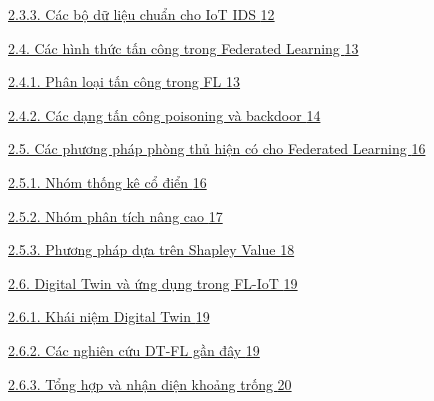 \hyperref[cuxe1c-bux1ed9-dux1eef-liux1ec7u-chuux1ea9n-cho-iot-ids]{2.3.3. Các bộ dữ liệu chuẩn cho IoT IDS \hyperref[cuxe1c-bux1ed9-dux1eef-liux1ec7u-chuux1ea9n-cho-iot-ids]{12}}

\hyperref[cuxe1c-huxecnh-thux1ee9c-tux1ea5n-cuxf4ng-trong-federated-learning]{2.4. Các hình thức tấn công trong Federated Learning \hyperref[cuxe1c-huxecnh-thux1ee9c-tux1ea5n-cuxf4ng-trong-federated-learning]{13}}

\hyperref[phuxe2n-loux1ea1i-tux1ea5n-cuxf4ng-trong-fl]{2.4.1. Phân loại tấn công trong FL \hyperref[phuxe2n-loux1ea1i-tux1ea5n-cuxf4ng-trong-fl]{13}}

\hyperref[cuxe1c-dux1ea1ng-tux1ea5n-cuxf4ng-poisoning-vuxe0-backdoor]{2.4.2. Các dạng tấn công poisoning và backdoor \hyperref[cuxe1c-dux1ea1ng-tux1ea5n-cuxf4ng-poisoning-vuxe0-backdoor]{14}}

\hyperref[cuxe1c-phux1b0ux1a1ng-phuxe1p-phuxf2ng-thux1ee7-hiux1ec7n-cuxf3-cho-federated-learning]{2.5. Các phương pháp phòng thủ hiện có cho Federated Learning \hyperref[cuxe1c-phux1b0ux1a1ng-phuxe1p-phuxf2ng-thux1ee7-hiux1ec7n-cuxf3-cho-federated-learning]{16}}

\hyperref[nhuxf3m-thux1ed1ng-kuxea-cux1ed5-ux111iux1ec3n]{2.5.1. Nhóm thống kê cổ điển \hyperref[nhuxf3m-thux1ed1ng-kuxea-cux1ed5-ux111iux1ec3n]{16}}

\hyperref[nhuxf3m-phuxe2n-tuxedch-nuxe2ng-cao]{2.5.2. Nhóm phân tích nâng cao \hyperref[nhuxf3m-phuxe2n-tuxedch-nuxe2ng-cao]{17}}

\hyperref[phux1b0ux1a1ng-phuxe1p-dux1ef1a-truxean-shapley-value]{2.5.3. Phương pháp dựa trên Shapley Value \hyperref[phux1b0ux1a1ng-phuxe1p-dux1ef1a-truxean-shapley-value]{18}}

\hyperref[digital-twin-vuxe0-ux1ee9ng-dux1ee5ng-trong-fl-iot]{2.6. Digital Twin và ứng dụng trong FL-IoT \hyperref[digital-twin-vuxe0-ux1ee9ng-dux1ee5ng-trong-fl-iot]{19}}

\hyperref[khuxe1i-niux1ec7m-digital-twin]{2.6.1. Khái niệm Digital Twin \hyperref[khuxe1i-niux1ec7m-digital-twin]{19}}

\hyperref[cuxe1c-nghiuxean-cux1ee9u-dt-fl-gux1ea7n-ux111uxe2y]{2.6.2. Các nghiên cứu DT-FL gần đây \hyperref[cuxe1c-nghiuxean-cux1ee9u-dt-fl-gux1ea7n-ux111uxe2y]{19}}

\hyperref[tux1ed5ng-hux1ee3p-vuxe0-nhux1eadn-diux1ec7n-khoux1ea3ng-trux1ed1ng]{2.6.3. Tổng hợp và nhận diện khoảng trống \hyperref[tux1ed5ng-hux1ee3p-vuxe0-nhux1eadn-diux1ec7n-khoux1ea3ng-trux1ed1ng]{20}}

